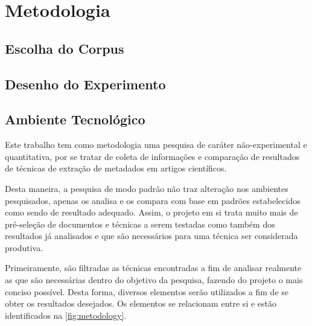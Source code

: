 
\chapter{Metodologia}
\label{cha:metodology}

\section{Escolha do Corpus}
\label{sec:corpus}

\section{Desenho do Experimento}
\label{sec:experiment-design}

\section{Ambiente Tecnológico}
\label{sec:tech-environment}

Este trabalho tem como metodologia uma pesquisa de caráter não-experimental e quantitativa, por se tratar de coleta de informações e comparação de resultados de técnicas de extração de metadados em artigos científicos.

Desta maneira, a pesquisa de modo padrão não traz alteração nos ambientes pesquisados, apenas os analisa e os compara com base em padrões estabelecidos como sendo de resultado adequado. Assim, o projeto em si trata muito mais de pré-seleção de documentos e técnicas a serem testadas como também dos resultados já analisados e que são necessários para uma técnica ser considerada produtiva.


Primeiramente, são filtradas as técnicas encontradas a fim de analisar realmente as que são necessárias dentro do objetivo da pesquisa, fazendo do projeto o mais conciso possível. Desta forma, diversos elementos serão utilizados a fim de se obter os resultados desejados. Os elementos se relacionam entre si e estão identificados na \autoref{fig:metodology}. 


